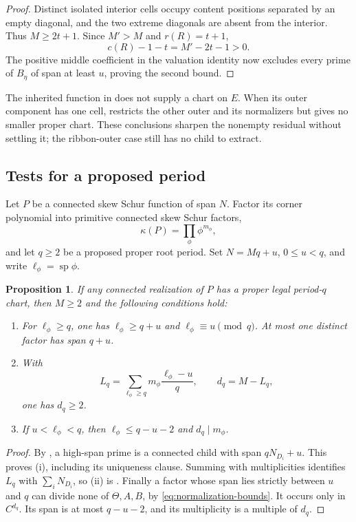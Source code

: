 \documentclass[11pt,a4paper]{amsart}
\numberwithin{equation}{section}
\theoremstyle{plain}
\newtheorem{proposition}[theorem]{Proposition}
\theoremstyle{definition}
\begin{document}
\begin{proof}
Distinct isolated interior cells occupy content positions separated by an empty diagonal, and the two extreme diagonals are absent from the interior.  Thus \(M\ge2t+1\).  Since \(M'>M\) and \(r(R)=t+1\),
\begin{equation*}
 c(R)-1-t=M'-2t-1>0.
\end{equation*}
The positive middle coefficient in the valuation identity now excludes every prime of \(B_\eta\) of span at least \(u\), proving the second bound.
\end{proof}

The inherited function in  does not supply a chart on \(E\).  When its outer component has one cell,  restricts the other outer and its normalizers but gives no smaller proper chart.  These conclusions sharpen the nonempty residual without settling it; the ribbon-outer case still has no child to extract.

\subsection{Tests for a proposed period}

Let \(P\) be a connected skew Schur function of span \(N\).  Factor its corner polynomial into primitive connected skew Schur factors,
\begin{equation*}
 \kappa(P)=\prod_\phi\phi^{m_\phi},
\end{equation*}
and let \(q\ge2\) be a proposed proper root period.  Set \(N=Mq+u\), \(0\le u<q\), and write \(\ell_\phi=\operatorname{sp}\phi\).

\begin{proposition}\label{prop:period-tests}
If any connected realization of \(P\) has a proper legal period-\(q\) chart, then \(M\ge2\) and the following conditions hold:
\begin{enumerate}
\item For \(\ell_\phi\ge q\), one has \(\ell_\phi\ge q+u\) and \(\ell_\phi\equiv u\pmod q\).  At most one distinct factor has span \(q+u\).
\item With
\begin{equation}\label{eq:candidate-defect}
 L_q=\sum_{\ell_\phi\ge q}m_\phi\frac{\ell_\phi-u}{q},\qquad d_q=M-L_q,
\end{equation}
one has \(d_q\ge2\).
\item If \(u<\ell_\phi<q\), then \(\ell_\phi\le q-u-2\) and \(d_q\mid m_\phi\).
\end{enumerate}
\end{proposition}
\begin{proof}
By , a high-span prime is a connected child with span \(qN_{D_i}+u\).  This proves (i), including its uniqueness clause.  Summing with multiplicities identifies \(L_q\) with \(\sum_iN_{D_i}\), so (ii) is .  Finally a factor whose span lies strictly between \(u\) and \(q\) can divide none of \(\Theta,A,B\), by \eqref{eq:normalization-bounds}.  It occurs only in \(C^{d_q}\).  Its span is at most \(q-u-2\), and its multiplicity is a multiple of \(d_q\).
\end{proof}
\end{document}
